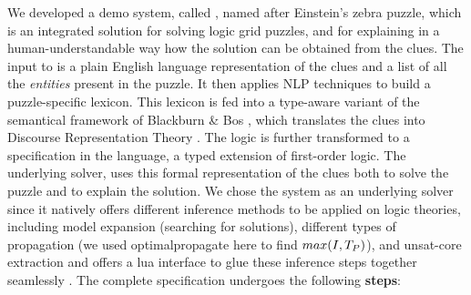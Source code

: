 % 
We developed a demo system, called \ourtool, named after Einstein's zebra puzzle, which is an integrated solution for solving logic grid puzzles, and for explaining in a human-understandable way how the solution can be obtained from the clues. 
The input to \ourtool is a plain English language representation of the clues and a list of all the \textit{entities} present in the puzzle. It then applies NLP techniques to build a puzzle-specific lexicon. This lexicon is fed into a type-aware variant of the semantical framework of Blackburn \& Bos \cite{Blackburn2005,Blackburn2006}, which translates the clues into Discourse Representation Theory \cite{DRT}. The logic is further transformed to a specification in the \idp language, a typed extension of first-order logic. 
% 
The underlying solver, \idp\cite{IDP} uses this formal representation of the clues both to solve the puzzle and to explain the solution. 
We chose the \idp system as an underlying solver since it natively offers different inference methods to be applied on logic theories, including model expansion (searching for solutions), different types of propagation (we used optimalpropagate here to find $max(I,T_P)$), and unsat-core extraction and offers a lua interface to glue these inference steps together seamlessly \cite{IDP}. 
The complete specification undergoes the following \textbf{steps}:
